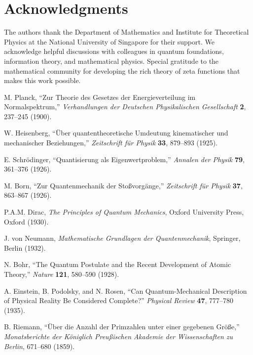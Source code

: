 \documentclass[11pt]{article}
\theoremstyle{plain}
\theoremstyle{definition}
\theoremstyle{remark}
\begin{document}
\section*{Acknowledgments}

The authors thank the Department of Mathematics and Institute for Theoretical Physics at the National University of Singapore for their support. We acknowledge helpful discussions with colleagues in quantum foundations, information theory, and mathematical physics. Special gratitude to the mathematical community for developing the rich theory of zeta functions that makes this work possible.



\begin{thebibliography}{99}

 M. Planck, ``Zur Theorie des Gesetzes der Energieverteilung im Normalspektrum,'' \emph{Verhandlungen der Deutschen Physikalischen Gesellschaft} \textbf{2}, 237--245 (1900).

 W. Heisenberg, ``Über quantentheoretische Umdeutung kinematischer und mechanischer Beziehungen,'' \emph{Zeitschrift für Physik} \textbf{33}, 879--893 (1925).

 E. Schrödinger, ``Quantisierung als Eigenwertproblem,'' \emph{Annalen der Physik} \textbf{79}, 361--376 (1926).

 M. Born, ``Zur Quantenmechanik der Stoßvorgänge,'' \emph{Zeitschrift für Physik} \textbf{37}, 863--867 (1926).

 P.A.M. Dirac, \emph{The Principles of Quantum Mechanics}, Oxford University Press, Oxford (1930).

 J. von Neumann, \emph{Mathematische Grundlagen der Quantenmechanik}, Springer, Berlin (1932).

 N. Bohr, ``The Quantum Postulate and the Recent Development of Atomic Theory,'' \emph{Nature} \textbf{121}, 580--590 (1928).

 A. Einstein, B. Podolsky, and N. Rosen, ``Can Quantum-Mechanical Description of Physical Reality Be Considered Complete?'' \emph{Physical Review} \textbf{47}, 777--780 (1935).

 B. Riemann, ``Über die Anzahl der Primzahlen unter einer gegebenen Größe,'' \emph{Monatsberichte der Königlich Preußischen Akademie der Wissenschaften zu Berlin}, 671--680 (1859).


\end{thebibliography}
\end{document}

